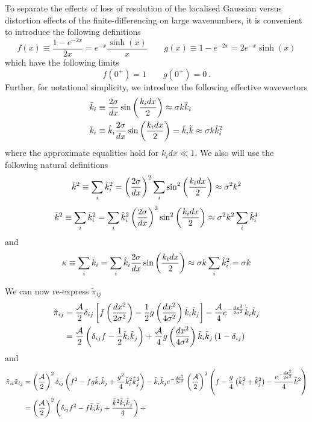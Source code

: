 \documentclass{revtex4}
\begin{document}
To separate the effects of loss of resolution of the localised Gaussian versus distortion effects of the finite-differencing on large wavenumbers, it is convenient to introduce the following definitions
\begin{equation}
  f(x) \equiv \frac{1-e^{-2x}}{2x} = e^{-x}\frac{\sinh(x)}{x} \qquad g(x) \equiv 1-e^{-2x} = 2e^{-x}\sinh(x)
\end{equation}
which have the following limits
\begin{equation}
  f(0^+) = 1 \qquad g(0^+) = 0 \, .
\end{equation}
Further, for notational simplicity, we introduce the following effective wavevectors
\begin{subequations}
\begin{align}
  \tilde{k}_i &\equiv \frac{2\sigma}{dx}\sin\left(\frac{k_idx}{2}\right) \approx \sigma k\hat{k}_i \\
  \bar{k}_i &\equiv \hat{k}_i\frac{2\sigma}{dx}\sin\left(\frac{k_idx}{2}\right) = \hat{k}_i\tilde{k} \approx \sigma k\hat{k}_i^2
\end{align}
\end{subequations}
where the approximate equalities hold for $k_idx \ll 1$.
We also will use the following natural definitions
\begin{equation}
  \tilde{k}^2 \equiv \sum_i\tilde{k}_i^2 = \left(\frac{2\sigma}{dx}\right)^2\sum_i\sin^2\left(\frac{k_idx}{2}\right) \approx \sigma^2k^2
\end{equation}
\begin{equation}
  \bar{k}^2 \equiv \sum_i\bar{k}_i^2 = \sum_i \hat{k}_i^2\left(\frac{2\sigma}{dx}\right)^2\sin^2\left(\frac{k_idx}{2}\right) \approx \sigma^2k^2\sum_i\hat{k}_i^4
\end{equation}
and
\begin{equation}
  \kappa \equiv \sum_i\bar{k}_i = \sum_i\hat{k}_i\frac{2\sigma}{dx}\sin\left(\frac{k_idx}{2}\right) \approx \sigma k\sum_i\hat{k}_i^2 = \sigma k
\end{equation}

We can now re-express $\tilde{\pi}_{ij}$
\begin{align}
  \tilde{\pi}_{ij} &= \frac{\mathcal{A}}{2}\delta_{ij}\left[f\left(\frac{dx^2}{2\sigma^2}\right) - \frac{1}{2}g\left(\frac{dx^2}{4\sigma^2}\right)\tilde{k}_i\tilde{k}_j\right] - \frac{\mathcal{A}}{4}e^{-\frac{dx^2}{2\sigma^2}}\tilde{k}_i\tilde{k}_j \\
  &= \frac{\mathcal{A}}{2}\left(\delta_{ij}f - \frac{1}{2}\tilde{k}_i\tilde{k}_j\right) + \frac{\mathcal{A}}{4}g\left(\frac{dx^2}{4\sigma^2}\right)\tilde{k}_i\tilde{k}_j\left(1-\delta_{ij}\right)
\end{align}
and
\begin{align}
  \tilde{\pi}_{il}\tilde{\pi}_{lj} &= \left(\frac{\mathcal{A}}{2}\right)^2\delta_{ij}\left(f^2 - fg\tilde{k}_i\tilde{k}_j + \frac{g^2}{4}\tilde{k}_i^2\tilde{k}_j^2\right) - \tilde{k}_i\tilde{k}_je^{-\frac{dx^2}{2\sigma^2}}\left(\frac{\mathcal{A}}{2}\right)^2\left( f- \frac{g}{4}\left(\tilde{k}_i^2+\tilde{k}_j^2\right) - \frac{e^{-\frac{dx^2}{2\sigma^2}}}{4}\tilde{k}^2\right) \\
  &= \left(\frac{\mathcal{A}}{2}\right)^2\left(\delta_{ij}f^2 - f\tilde{k}_i\tilde{k}_j+\frac{\tilde{k}^2\tilde{k}_i\tilde{k}_j}{4}\right) + 
\end{align}
\end{document}

